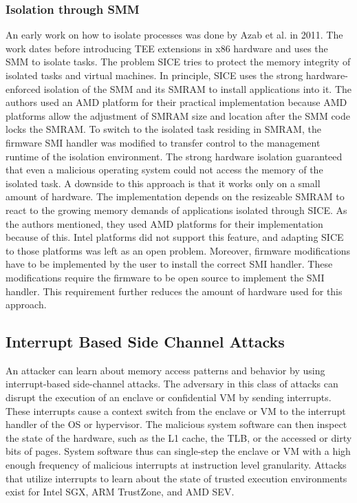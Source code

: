 \subsubsection{Isolation through SMM}
\label{sec:20:isolation_smm}
An early work on how to isolate processes was done by Azab et al. in
2011.\cite{azab_sice_2011} The work dates before introducing TEE extensions in
x86 hardware and uses the SMM to isolate tasks. The problem SICE tries to
protect the memory integrity of isolated tasks and virtual machines. In
principle, SICE uses the strong hardware-enforced isolation of the SMM and its
SMRAM to install applications into it. The authors used an AMD platform for
their practical implementation because AMD platforms allow the adjustment of
SMRAM size and location after the SMM code locks the SMRAM.\cite{bios2014amd} To
switch to the isolated task residing in SMRAM, the firmware SMI handler was
modified to transfer control to the management runtime of the isolation
environment. The strong hardware isolation guaranteed that even a malicious
operating system could not access the memory of the isolated task. A downside to
this approach is that it works only on a small amount of hardware. The
implementation depends on the resizeable SMRAM to react to the growing memory
demands of applications isolated through SICE. As the authors mentioned, they
used AMD platforms for their implementation because of this. Intel platforms did
not support this feature, and adapting SICE to those platforms was left as an
open problem. Moreover, firmware modifications have to be implemented by the
user to install the correct SMI handler. These modifications require the
firmware to be open source to implement the SMI handler. This requirement
further reduces the amount of hardware used for this approach.

\subsection{Interrupt Based Side Channel Attacks}
\label{sec:20:interrupt_sca}
An attacker can learn about memory access patterns and behavior by using
interrupt-based side-channel attacks. The adversary in this class of attacks can
disrupt the execution of an enclave or confidential VM by sending interrupts.
These interrupts cause a context switch from the enclave or VM to the interrupt
handler of the OS or hypervisor. The malicious system software can then inspect
the state of the hardware, such as the L1 cache, the TLB, or the accessed or
dirty bits of pages. System software thus can single-step the enclave or VM with
a high enough frequency of malicious interrupts at instruction level
granularity. Attacks that utilize interrupts to learn about the state of trusted
execution environments exist for Intel SGX, ARM TrustZone, and AMD
SEV.\cite{van2017sgx, kou2021load, wilke2023sev}\\

